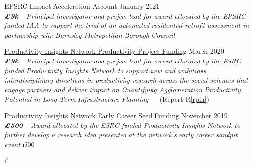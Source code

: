 \documentclass[10pt]{article}
\newcommand{\blankline}{\quad\pagebreak[3]}
\begin{document}
\blankline

EPSRC Impact Acceleration Account \hfill {January 2021}\\
\emph{\textbf{\pounds9k} -- Principal investigator and project lead for award allocated by the EPSRC-funded IAA to support the trial of an automated residential retrofit assessment in partnership with Barnsley Metropolitan Borough Council}
\FPset{}
\FPset{}

\blankline

\href{https://productivityinsightsnetwork.co.uk/projects/}{Productivity Insights Network Productivity Project Funding} \hfill {March 2020}\\
\emph{\textbf{\pounds9k} -- Principal investigator and project lead for award allocated by the ESRC-funded Productivity Insights Network to support new and ambitious interdisciplinary directions in productivity research across the social sciences that engage partners and deliver impact on Quantifying Agglomeration Productivity Potential in Long-Term Infrastructure Planning} --- (Report R\ref{rpin})
\FPset{}
\FPset{}

\blankline

Productivity Insights Network Early Career Seed Funding \hfill {November 2019}\\
\emph{\textbf{\pounds500} -- Award allocated by the ESRC-funded Productivity Insights Network to further develop a research idea presented at the network's early career sandpit event}
\FPset\i{500}
\FPset{}


\FPmul\im\i\ip
\FPmul\iim\ii\iip
\FPmul\iiim\iii\iiip
\FPmul\ivm\iv\ivp
\FPmul\vm\v\vp
\FPmul\vim\vi\vip
\FPmul\viim\vii\viip
\FPmul\viiim\viii\viiip
\FPmul\ixm\ix\ixp
\FPmul\xm\x\xp
\FPmul\xim\xi\xip
\FPmul\xiim\xii\xiip

\FPeval{}

\end{document}
